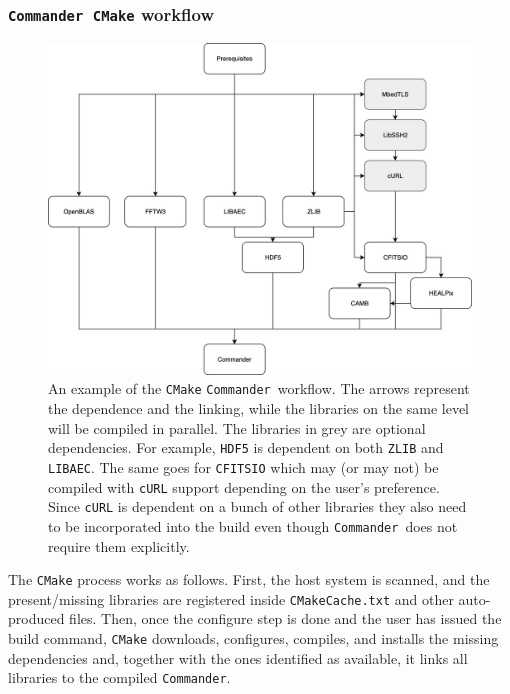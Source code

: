 \documentclass[twocolumn]{aa}
\def\commander{\texttt{Commander}}
\newcommand{\red}[0]{\color{red}}
\begin{document}
\subsubsection{\commander\ \texttt{CMake} workflow}
\label{sec:cmake-code-organization}

\begin{figure}[t]
      \center
      \includegraphics[scale=0.75]{figures/Commander_CMake_workflow.png}
      \caption{An example of the \texttt{CMake} \commander\ workflow. 
      The arrows represent the dependence and the linking, while the libraries 
      on the same level will be compiled in parallel. The libraries in grey are 
      optional dependencies. For example, \texttt{HDF5} is dependent on both \texttt{ZLIB} and \texttt{LIBAEC}. 
      The same goes for \texttt{CFITSIO} which may (or may not) be compiled with \texttt{cURL} 
      support depending on the user's preference. Since \texttt{cURL} is dependent on 
      a bunch of other libraries they also need to be incorporated into the build 
      even though \commander\ does not require them explicitly. %
      }
      \label{fig:cmake-workflow}
\end{figure}


The \texttt{CMake} process works as follows. First, the host system is scanned, and the present/missing  libraries are registered inside \texttt{CMakeCache.txt} and other auto-produced files. Then, once the configure step is done and the user has issued the build command, \texttt{CMake} downloads, configures, compiles, and installs the missing dependencies and, together with the ones identified as available, it links all libraries to the compiled \commander.
\end{document}
